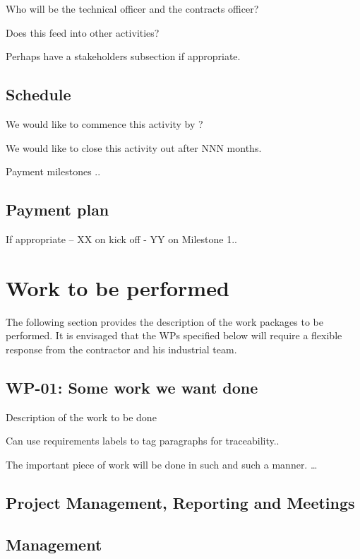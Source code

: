 \documentclass[DM,lsstdraft,SOW]{lsstdoc}
\begin{document}
Who will be the technical officer and the contracts officer?

Does this feed into other activities?

Perhaps have a stakeholders subsection if appropriate.

\subsection{Schedule}
We would like to commence this activity by ?

We would like to close this activity out after NNN months.

Payment milestones ..

\subsection{Payment plan}
If appropriate -- XX on kick off - YY on Milestone 1..

\section{Work to be performed} \label{sect:wps}
The following section provides the description of the work packages to be performed. It is envisaged that the
WPs specified below will require a flexible response from the contractor and his industrial team.

\subsection{{\bf WP-01:} Some work we want done \label{wp1}}
Description of the work to be done

Can use requirements labels to tag paragraphs for traceability..


         {      \label{req:wp1:sometask}
The important piece of work will be done in such and such a manner. \ldots
 }




\subsection{Project Management, Reporting and Meetings}

\subsection{Management}
\end{document}
